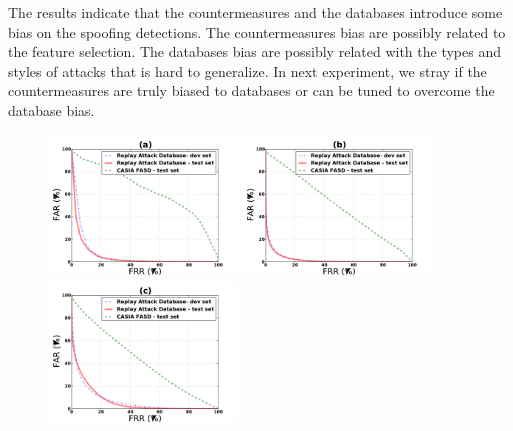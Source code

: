 The results indicate that the countermeasures and the databases introduce some bias on the spoofing detections. The countermeasures bias are possibly related to the feature selection. The databases bias are possibly related with the types and styles of attacks that is hard to generalize. In next experiment, we stray if the countermeasures are truly biased to databases or can be tuned to overcome the database bias.

\begin{figure}[ht]
\begin{center}
\includegraphics [width=5cm] {plots/CROSS-DATABASE/MOTION/roc_replay-machine.pdf} 
\includegraphics [width=5cm] {plots/CROSS-DATABASE/LBPTOP/roc_replay-machine.pdf}
\includegraphics [width=5cm] {plots/CROSS-DATABASE/LBP/roc_replay-machine.pdf}


\end{center}
\end{figure}
